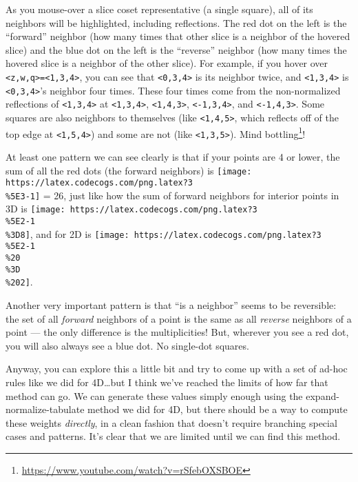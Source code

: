 \documentclass[]{article}
\renewcommand{\href}[2]{#2\footnote{\url{#1}}}
\begin{document}
As you mouse-over a slice coset representative (a single square), all of its
neighbors will be highlighted, including reflections. The red dot on the left is
the ``forward'' neighbor (how many times that other slice is a neighbor of the
hovered slice) and the blue dot on the left is the ``reverse'' neighbor (how
many times the hovered slice is a neighbor of the other slice). For example, if
you hover over
\texttt{\textless{}z,w,q\textgreater{}=\textless{}1,3,4\textgreater{}}, you can
see that \texttt{\textless{}0,3,4\textgreater{}} is its neighbor twice, and
\texttt{\textless{}1,3,4\textgreater{}} is
\texttt{\textless{}0,3,4\textgreater{}}'s neighbor four times. These four times
come from the non-normalized reflections of
\texttt{\textless{}1,3,4\textgreater{}} at
\texttt{\textless{}1,3,4\textgreater{}},
\texttt{\textless{}1,4,3\textgreater{}},
\texttt{\textless{}-1,3,4\textgreater{}}, and
\texttt{\textless{}-1,4,3\textgreater{}}. Some squares are also neighbors to
themselves (like \texttt{\textless{}1,4,5\textgreater{}}, which reflects off of
the top edge at \texttt{\textless{}1,5,4\textgreater{}}) and some are not (like
\texttt{\textless{}1,3,5\textgreater{}}).
\href{https://www.youtube.com/watch?v=rSfebOXSBOE}{Mind bottling}!

At least one pattern we can see clearly is that if your points are 4 or lower,
the sum of all the red dots (the forward neighbors) is
\texttt{[image: https://latex.codecogs.com/png.latex?3\\\%5E3-1]} = 26, just like
how the sum of forward neighbors for interior points in 3D is
\texttt{[image: https://latex.codecogs.com/png.latex?3\\\%5E2-1\\\%3D8]}, and for 2D
is \texttt{[image: https://latex.codecogs.com/png.latex?3\\\%5E2-1\\\%20\\\%3D\\\%202]}.

Another very important pattern is that ``is a neighbor'' seems to be reversible:
the set of all \emph{forward} neighbors of a point is the same as all
\emph{reverse} neighbors of a point --- the only difference is the
multiplicities! But, wherever you see a red dot, you will also always see a blue
dot. No single-dot squares.

Anyway, you can explore this a little bit and try to come up with a set of
ad-hoc rules like we did for 4D\ldots but I think we've reached the limits of
how far that method can go. We can generate these values simply enough using the
expand-normalize-tabulate method we did for 4D, but there should be a way to
compute these weights \emph{directly}, in a clean fashion that doesn't require
branching special cases and patterns. It's clear that we are limited until we
can find this method.
\end{document}
